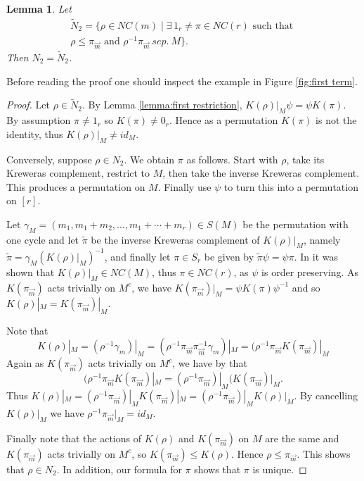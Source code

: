 \documentclass[11pt]{amsart}
\newtheorem{lemma}[theorem]{Lemma}
\theoremstyle{definition}
\numberwithin{theorem}{section}
\newcommand{\sM}{{\scriptscriptstyle M}}
\newcommand{\NC}{\mathit{NC}}
\newcommand{\vm}{{\vec{m}}}
\newcommand{\sep}{\mathit{\ sep.\ }}
\newcommand{\id}{\mathit{id}}
\begin{document}
\begin{lemma}\label{lemma:first bijection}
Let 
\begin{multline}
\tilde{N}_2 =
\{ \rho \in \NC(m) \mid \exists\,
1_r \not =\pi \in \NC(r) \mbox{\ such that\ } \\
\rho \leq \pi_\vm 
\mbox{\ and\ }
\rho^{-1}\pi_\vm \sep M\}.
\end{multline}
Then $N_2 = \tilde{N}_2$.
\end{lemma}

Before reading the proof one should inspect the example in
Figure \ref{fig:first term}.


\begin{proof}
Let $\rho \in \tilde{N}_2$. By Lemma \ref{lemma:first
  restriction}, $K(\rho)|_\sM \psi = \psi K(\pi)$. By
assumption $\pi \not = 1_r$ so $K(\pi) \not= 0_r$. Hence as
a permutation $K(\pi)$ is not the identity, thus
$K(\rho)|_\sM \not= \id_\sM$.

Conversely, suppose $\rho \in N_2$. We obtain $\pi$ as
follows.  Start with $\rho$, take its Kreweras complement,
restrict to $M$, then take the inverse Kreweras
complement. This produces a permutation on $M$. Finally use
$\psi$ to turn this into a permutation on $[r]$.

Let $\gamma_\sM = (m_1, m_1 + m_2, \dots, m_1 + \cdots +
m_r) \in S(M)$ be the permutation with one cycle and let
$\tilde\pi$ be the inverse Kreweras complement of
$K(\rho)|_\sM$, namely $\tilde\pi = \gamma_\sM
(K(\rho)|_\sM)^{-1}$, and finally let $\pi \in S_r$ be given
by $\tilde\pi\psi = \psi\pi$. In \cite[Notation 4]{mst} it
was shown that $K(\rho)|_\sM \in \NC(M)$, thus $\pi \in
\NC(r)$, as $\psi$ is order preserving. As $K(\pi_\vm)$ acts
trivially on $M^c$, we have $K(\pi_\vm)|_\sM = \psi K(\pi)
\psi^{-1}$ and so $K(\rho)|_\sM = K(\pi_\vm)|_\sM$.

Note that 
\[
K(\rho)|_\sM = (\rho^{-1} \gamma_m )|_\sM = 
(\rho^{-1} \pi_\vm \pi_\vm^{-1} \gamma_m)|_\sM
=
(\rho^{-1} \pi_\vm K(\pi_\vm)|_\sM
\]
Again as $K(\pi_\vm)$ acts trivially on $M^c$, we have by
\cite[Lemma 6]{mst} that
\[
(\rho^{-1} \pi_\vm K(\pi_\vm)|_\sM
=
(\rho^{-1} \pi_\vm)|_\sM (K(\pi_\vm)|_\sM.
\]
Thus $K(\rho)|_\sM = (\rho^{-1}\pi_\vm)|_\sM K(\pi_\vm
)|_\sM = (\rho^{-1}\pi_\vm)|_\sM K(\rho )|_\sM$. By
cancelling $K(\rho)|_\sM$ we have $\rho^{-1}\pi_\vm|_\sM =
\id_\sM$.

Finally note that the actions of $K(\rho)$ and $K(\pi_\vm )$
on $M$ are the same and $K(\pi_\vm)$ acts trivially on
$M^c$, so $K(\pi_\vm) \leq K(\rho)$. Hence $\rho \leq
\pi_\vm$. This shows that $\rho \in N_2$. In addition, our
formula for $\pi$ shows that $\pi$ is unique.
\end{proof}
\end{document}
